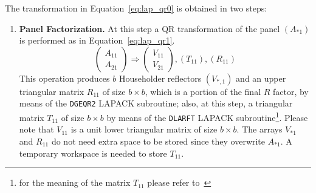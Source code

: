 \documentclass[runningheads]{llncs}
\begin{document}
The transformation in Equation~\eqref{eq:lap_qr0} is obtained in two
steps:
\begin{enumerate}
\item {\bf Panel Factorization.} At this step a QR transformation of
  the panel $(A_{*1})$ is performed as in Equation~\eqref{eq:lap_qr1}.
  \begin{equation}
    \label{eq:lap_qr1}
    \left(\begin{array}{c}
        A_{11} \\
        A_{21}
      \end{array}\right) \Longrightarrow
    \left(\begin{array}{c}
        V_{11} \\
        V_{21}
      \end{array}\right), (T_{11}), (R_{11})
  \end{equation}
  This operation produces $b$ Householder reflectors $(V_{*,1})$ and
  an upper triangular matrix $R_{11}$ of size $b \times b$, which is a
  portion of the final $R$ factor, by means of the
  \texttt{DGEQR2} LAPACK subroutine; also, at this step, a triangular matrix $T_{11}$
  of size $b \times b$  by means of the \texttt{DLARFT} LAPACK
  subroutine\footnote{for the meaning of the matrix $T_{11}$ please
    refer to~\cite{64889}}. Please note that $V_{11}$ is a unit lower
  triangular matrix of size $b \times b$. The arrays $V_{*1}$ and
  $R_{11}$ do not need extra space to be stored since they overwrite
  $A_{*1}$. A temporary workspace is needed to store $T_{11}$.


\end{enumerate}
\end{document}
